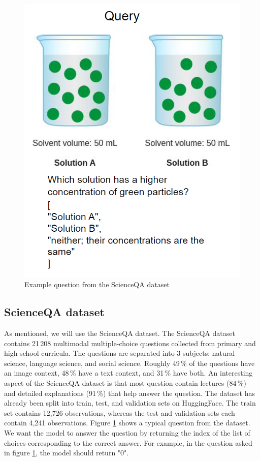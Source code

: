 \documentclass{article}
\begin{document}
\begin{figure}
  \centering
  \centerline{\includegraphics[scale=0.5]{example_question.png}}
  \caption{Example question from the ScienceQA dataset}
  \label{fig:example_q}
\end{figure}

\subsection{ScienceQA dataset}
As mentioned, we will use the ScienceQA dataset. The ScienceQA dataset contains 21\,208 multimodal multiple-choice questions collected from primary and high school curricula. The questions are separated into 3 subjects: natural science, language science, and social science. Roughly 49\,\% of the questions have an image context, 48\,\% have a text context, and 31\,\% have both. An interesting aspect of the ScienceQA dataset is that most question contain lectures (84\,\%) and detailed explanations (91\,\%) that help answer the question. The dataset has already been split into train, test, and validation sets on HuggingFace. The train set contains 12,726 observations, whereas the test and validation sets each contain 4,241 observations. Figure \ref{fig:example_q} shows a typical question from the dataset. We want the model to answer the question by returning the index of the list of choices corresponding to the correct answer. For example, in the question asked in figure \ref{fig:example_q}, the model should return "0".
\end{document}
